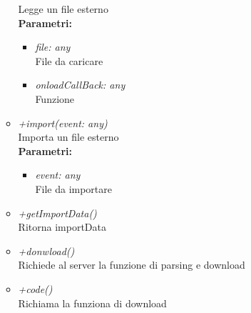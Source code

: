 \begin{itemize}
\begin{itemize}
    		Legge un file esterno\\
    		\textbf{Parametri:}
    		\begin{itemize}
    			\item \emph{file: any}\\
    			File da caricare
    			\item \emph{onloadCallBack: any}\\
    			Funzione
    		\end{itemize}
    		\item \emph{+import(event: any)}\\
    		Importa un file esterno\\
    		\textbf{Parametri:}
    		\begin{itemize}
    			\item \emph{event: any}\\
    			File da importare
    		\end{itemize}
    		\item \emph{+getImportData()}\\
    		Ritorna importData
    		\item \emph{+donwload()}\\
    		Richiede al server la funzione di parsing e download
    		\item \emph{+code()}\\
    		Richiama la funziona di download
		\end{itemize}
\end{itemize}